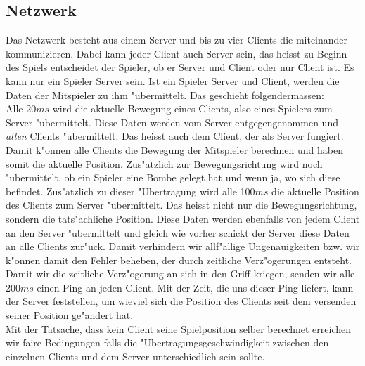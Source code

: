 \subsection{Netzwerk}
Das Netzwerk besteht aus einem Server und bis zu vier Clients die miteinander kommunizieren. Dabei kann jeder Client auch Server sein, das heisst
zu Beginn des Spiels entscheidet der Spieler, ob er Server und Client oder nur Client ist. Es kann nur ein Spieler Server sein.
Ist ein Spieler Server und Client, werden die Daten der Mitspieler zu ihm "ubermittelt. Das geschieht folgendermassen: \\
Alle 20\(ms\) wird die aktuelle Bewegung eines Clients, also eines Spielers zum Server "ubermittelt. Diese Daten werden vom Server
entgegengenommen und \textit{allen} Clients "ubermittelt. Das heisst auch dem Client, der als Server fungiert. Damit k"onnen alle
Clients die Bewegung der Mitspieler berechnen und haben somit die aktuelle Position. Zus"atzlich zur Bewegungsrichtung wird noch
"ubermittelt, ob ein Spieler eine Bombe gelegt hat und wenn ja, wo sich diese befindet. Zus"atzlich zu dieser "Ubertragung wird alle 100\(ms\) die
aktuelle Position des Clients zum Server "ubermittelt. Das heisst nicht nur die Bewegungsrichtung, sondern die tats"achliche Position.
Diese Daten werden ebenfalls von jedem Client an den Server "ubermittelt und gleich wie vorher schickt der Server diese Daten an alle
Clients zur"uck. Damit verhindern wir allf"allige Ungenauigkeiten bzw. wir k"onnen damit den Fehler beheben, der durch zeitliche Verz"ogerungen
entsteht. Damit wir die zeitliche Verz"ogerung an sich in den Griff kriegen, senden wir alle 200\(ms\) einen Ping an jeden Client. Mit der Zeit,
die uns dieser Ping liefert, kann der Server feststellen, um wieviel sich die Position des Clients seit dem versenden seiner Position ge"andert hat.
\\ Mit der Tatsache, dass kein Client seine Spielposition selber berechnet erreichen wir faire Bedingungen falls die "Ubertragungsgeschwindigkeit
zwischen den einzelnen Clients und dem Server unterschiedlich sein sollte.


